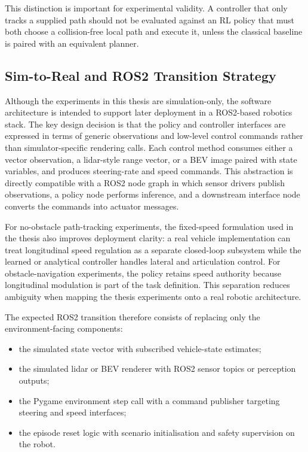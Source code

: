 This distinction is important for experimental validity. A controller that only tracks a supplied path should not be evaluated against an RL policy that must both choose a collision-free local path and execute it, unless the classical baseline is paired with an equivalent planner.

\subsection{Sim-to-Real and ROS2 Transition Strategy}

Although the experiments in this thesis are simulation-only, the software architecture is intended to support later deployment in a ROS2-based robotics stack. The key design decision is that the policy and controller interfaces are expressed in terms of generic observations and low-level control commands rather than simulator-specific rendering calls. Each control method consumes either a vector observation, a lidar-style range vector, or a BEV image paired with state variables, and produces steering-rate and speed commands. This abstraction is directly compatible with a ROS2 node graph in which sensor drivers publish observations, a policy node performs inference, and a downstream interface node converts the commands into actuator messages.

For no-obstacle path-tracking experiments, the fixed-speed formulation used in the thesis also improves deployment clarity: a real vehicle implementation can treat longitudinal speed regulation as a separate closed-loop subsystem while the learned or analytical controller handles lateral and articulation control. For obstacle-navigation experiments, the policy retains speed authority because longitudinal modulation is part of the task definition. This separation reduces ambiguity when mapping the thesis experiments onto a real robotic architecture.

The expected ROS2 transition therefore consists of replacing only the environment-facing components:
\begin{itemize}
    \item the simulated state vector with subscribed vehicle-state estimates;
    \item the simulated lidar or BEV renderer with ROS2 sensor topics or perception outputs;
    \item the Pygame environment step call with a command publisher targeting steering and speed interfaces;
    \item the episode reset logic with scenario initialisation and safety supervision on the robot.
\end{itemize}

